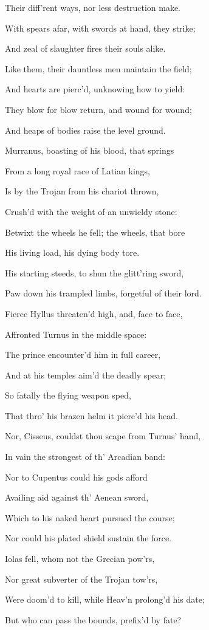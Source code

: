 Their diff’rent ways, nor less destruction make.

With spears afar, with swords at hand, they strike;

And zeal of slaughter fires their souls alike.

Like them, their dauntless men maintain the field;

And hearts are pierc’d, unknowing how to yield:

They blow for blow return, and wound for wound;

And heaps of bodies raise the level ground.

Murranus, boasting of his blood, that springs

From a long royal race of Latian kings,

Is by the Trojan from his chariot thrown,

Crush’d with the weight of an unwieldy stone:

Betwixt the wheels he fell; the wheels, that bore

His living load, his dying body tore.

His starting steeds, to shun the glitt’ring sword,

Paw down his trampled limbs, forgetful of their lord.

Fierce Hyllus threaten’d high, and, face to face,

Affronted Turnus in the middle space:

The prince encounter’d him in full career,

And at his temples aim’d the deadly spear;

So fatally the flying weapon sped,

That thro’ his brazen helm it pierc’d his head.

Nor, Cisseus, couldst thou scape from Turnus’ hand,

In vain the strongest of th’ Arcadian band:

Nor to Cupentus could his gods afford

Availing aid against th’ Aenean sword,

Which to his naked heart pursued the course;

Nor could his plated shield sustain the force.

Iolas fell, whom not the Grecian pow’rs,

Nor great subverter of the Trojan tow’rs,

Were doom’d to kill, while Heav’n prolong’d his date;

But who can pass the bounds, prefix’d by fate?

